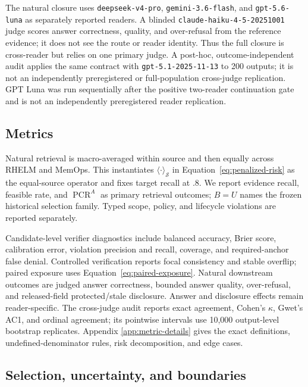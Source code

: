 \documentclass{article}
\begin{document}
The natural closure uses \texttt{deepseek-v4-pro},
\texttt{gemini-3.6-flash}, and \texttt{gpt-5.6-luna} as separately reported
readers.  A blinded \texttt{claude-haiku-4-5-20251001} judge scores answer
correctness, quality, and over-refusal from the reference evidence; it does not see
the route or reader identity.  Thus the full closure is cross-reader but relies on
one primary judge.  A post-hoc, outcome-independent audit applies the same contract
with \texttt{gpt-5.1-2025-11-13} to 200 outputs; it is not an independently
preregistered or full-population cross-judge replication.  GPT Luna was run
sequentially after the positive two-reader continuation gate and is not an
independently preregistered reader replication.

\subsection{Metrics}

Natural retrieval is macro-averaged within source and then equally across RHELM and
MemOps.  This instantiates $\langle\cdot\rangle_{\mathcal S}$ in
Equation~\ref{eq:penalized-risk} as the equal-source operator and fixes target recall
at $.8$.  We report evidence recall, feasible rate, and $\operatorname{PCR}^{A}$ as
primary retrieval outcomes; $B=U$ names the frozen historical selection family.
Typed scope, policy, and lifecycle violations are reported separately.

Candidate-level verifier diagnostics include balanced accuracy, Brier score,
calibration error, violation precision and recall, coverage, and required-anchor
false denial.  Controlled verification reports focal consistency and stable
overflip; paired exposure uses Equation~\ref{eq:paired-exposure}.  Natural downstream
outcomes are judged answer correctness, bounded answer quality, over-refusal, and
released-field protected/stale disclosure.  Answer and disclosure effects remain
reader-specific.  The cross-judge audit reports exact agreement, Cohen's $\kappa$,
Gwet's AC1, and ordinal agreement; its pointwise intervals use 10,000 output-level
bootstrap replicates.  Appendix
\ref{app:metric-details} gives the exact definitions, undefined-denominator rules,
risk decomposition, and edge cases.

\subsection{Selection, uncertainty, and boundaries}
\end{document}
